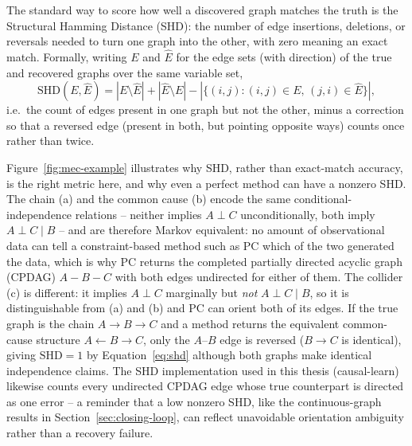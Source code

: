 \documentclass[
  english,
  class=report,
  accentcolor=2c,
  marginpar=false,
  parskip=half-,
  fontsize=11pt,
  ruledheaders=false,
  pdfa=false,
  IMRAD=false,
  thesis={type=master}
]{tudapub}
\begin{document}
The standard way to score how well a discovered graph matches the truth is
the Structural Hamming Distance (SHD): the number of edge insertions,
deletions, or reversals needed to turn one graph into the other, with zero
meaning an exact match. Formally, writing $E$ and $\hat{E}$ for the edge
sets (with direction) of the true and recovered graphs over the same
variable set,
\begin{equation}
\text{SHD}(E, \hat{E}) = |E \setminus \hat{E}| + |\hat{E} \setminus E| -
|\{(i,j) : (i,j) \in E,\, (j,i) \in \hat{E}\}|,
\label{eq:shd}
\end{equation}
i.e.\ the count of edges present in one graph but not the other, minus a
correction so that a reversed edge (present in both, but pointing opposite
ways) counts once rather than twice.

Figure~\ref{fig:mec-example} illustrates why SHD, rather than exact-match
accuracy, is the right metric here, and why even a perfect method can have
a nonzero SHD. The chain (a) and the common cause (b) encode the same
conditional-independence relations -- neither implies $A \perp C$
unconditionally, both imply $A \perp C \mid B$ -- and are therefore Markov
equivalent: no amount of observational data can tell a constraint-based
method such as PC which of the two generated the data, which is why PC
returns the completed partially directed acyclic graph (CPDAG) $A - B - C$
with both edges undirected for either of them. The collider (c) is
different: it implies $A \perp C$ marginally but \emph{not} $A \perp C \mid
B$, so it is distinguishable from (a) and (b) and PC can orient both of its
edges. If the true graph is the chain $A \to B \to C$ and a method returns
the equivalent common-cause structure $A \leftarrow B \to C$, only the
$A$--$B$ edge is reversed ($B \to C$ is identical), giving $\text{SHD} = 1$
by Equation~\ref{eq:shd} although both graphs make identical independence
claims. The SHD implementation used in this thesis (causal-learn) likewise
counts every undirected CPDAG edge whose true counterpart is directed as
one error -- a reminder that a low nonzero SHD, like the continuous-graph
results in Section~\ref{sec:closing-loop}, can reflect unavoidable
orientation ambiguity rather than a recovery failure.
\end{document}
